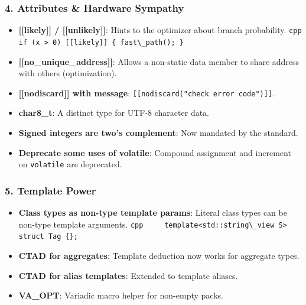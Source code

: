 \hypertarget{attributes-hardware-sympathy}{%
\subsubsection{4. Attributes \& Hardware
Sympathy}\label{attributes-hardware-sympathy}}

\begin{itemize}
\tightlist
\item
  \textbf{{[}{[}likely{]}{]} / {[}{[}unlikely{]}{]}}: Hints to the
  optimizer about branch probability.
  \passthrough{\lstinline!cpp     if (x > 0) [[likely]] \{ fast\_path(); \}!}
\item
  \textbf{{[}{[}no\_unique\_address{]}{]}}: Allows a non-static data
  member to share address with others (optimization).
\item
  \textbf{{[}{[}nodiscard{]}{]} with message}:
  \passthrough{\lstinline![[nodiscard("check error code")]]!}.
\item
  \textbf{char8\_t}: A distinct type for UTF-8 character data.
\item
  \textbf{Signed integers are two's complement}: Now mandated by the
  standard.
\item
  \textbf{Deprecate some uses of volatile}: Compound assignment and
  increment on \passthrough{\lstinline!volatile!} are deprecated.
\end{itemize}

\hypertarget{template-power}{%
\subsubsection{5. Template Power}\label{template-power}}

\begin{itemize}
\tightlist
\item
  \textbf{Class types as non-type template params}: Literal class types
  can be non-type template arguments.
  \passthrough{\lstinline!cpp     template<std::string\_view S> struct Tag \{\};!}
\item
  \textbf{CTAD for aggregates}: Template deduction now works for
  aggregate types.
\item
  \textbf{CTAD for alias templates}: Extended to template aliases.
\item
  \textbf{\textbf{VA\_OPT}}: Variadic macro helper for non-empty packs.
\end{itemize}
